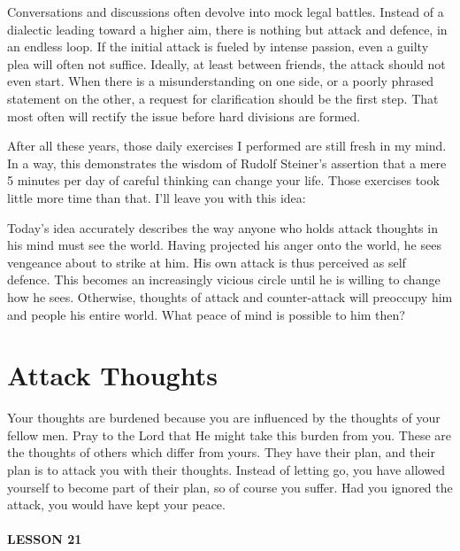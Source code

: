 Conversations and discussions often devolve into mock legal battles. Instead of a dialectic leading toward a higher aim, there is nothing but attack and defence, in an endless loop. If the initial attack is fueled by intense passion, even a guilty plea will often not suffice. Ideally, at least between friends, the attack should not even start. When there is a misunderstanding on one side, or a poorly phrased statement on the other, a request for clarification should be the first step. That most often will rectify the issue before hard divisions are formed.

After all these years, those daily exercises I performed are still fresh in my mind. In a way, this demonstrates the wisdom of Rudolf Steiner's assertion that a mere 5 minutes per day of careful thinking can change your life. Those exercises took little more time than that. I'll leave you with this idea:

\begin{quotex}
Today's idea accurately describes the way anyone who holds attack thoughts in his mind must see the world. Having projected his anger onto the world, he sees vengeance about to strike at him. His own attack is thus perceived as self defence. This becomes an increasingly vicious circle until he is willing to change how he sees. Otherwise, thoughts of attack and counter-attack will preoccupy him and people his entire world. What peace of mind is possible to him then?
\end{quotex}

\section{Attack Thoughts}

\begin{quotex}
Your thoughts are burdened because you are influenced by the thoughts of your fellow men. Pray to the Lord that He might take this burden from you. These are the thoughts of others which differ from yours. They have their plan, and their plan is to attack you with their thoughts. Instead of letting go, you have allowed yourself to become part of their plan, so of course you suffer. Had you ignored the attack, you would have kept your peace. 
\end{quotex}

\paragraph{LESSON 21}

